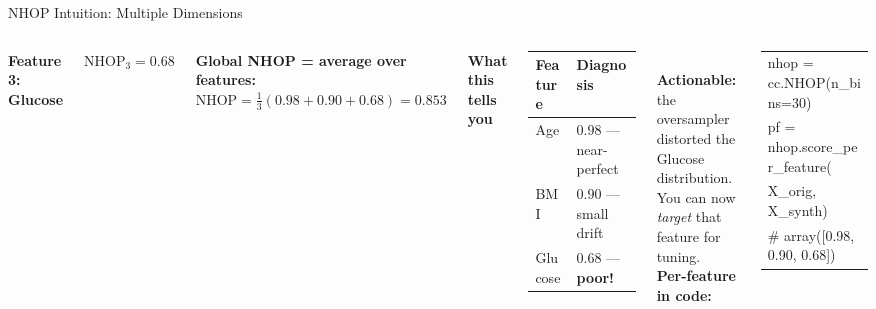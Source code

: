 \documentclass[aspectratio=169,10pt]{beamer}
\newcommand{\NHOP}{\mathrm{NHOP}}
\begin{document}
\begin{frame}[t]{NHOP Intuition: Multiple Dimensions}
\begin{columns}[T]
\begin{columns}[T]
{\tiny\bfseries\color{myblue}Feature 3: Glucose}\\[1pt]
{\tiny\color{myred}$\NHOP_3 = 0.68$}
\end{columns}

\vspace{6pt}
{\small\bfseries\color{myblue}Global NHOP = average over features:}\\[2pt]
{\footnotesize
$\displaystyle\NHOP = \frac{1}{3}(0.98 + 0.90 + 0.68) = \mathbf{0.853}$
}

{\small\bfseries\color{myblue}What this tells you}\\[4pt]
{\footnotesize
\begin{tabular}{@{}lp{2.5cm}@{}}
\toprule
Feature & Diagnosis \\
\midrule
Age & $0.98$ — near-perfect \\
BMI & $0.90$ — small drift \\
Glucose & $0.68$ — \textbf{poor!} \\
\bottomrule
\end{tabular}
}\\[6pt]
{\footnotesize
\textbf{Actionable:} the oversampler distorted the Glucose distribution.
You can now \emph{target} that feature for tuning.}\\[6pt]

{\small\bfseries\color{myblue}Per-feature in code:}\\[2pt]
{\scriptsize\ttfamily\color{myblue}
\begin{tabular}{@{}l@{}}
nhop = cc.NHOP(n\_bins=30)\\
pf = nhop.score\_per\_feature(\\
\quad\quad X\_orig, X\_synth)\\
\# array([0.98, 0.90, 0.68])
\end{tabular}
}
\end{columns}
\end{frame}
\end{document}
